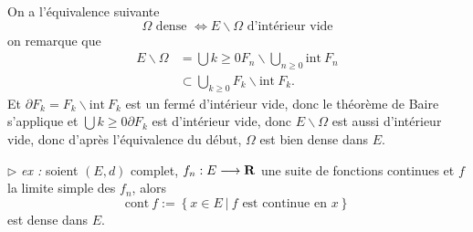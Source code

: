 \documentclass[a4paper,11pt, twoside]{article}
\begin{document}
\begin{Proof}
  On a l'équivalence suivante 
  $$\Omega\text{ dense }\Leftrightarrow E\backslash \Omega\text{ d'intérieur vide}$$
  on remarque que 
  \begin{align*}
    E\backslash\Omega&=\bigcup{k\geqslant 0}F_n\backslash\bigcup_{n\geqslant 0}\mathrm{int}\ F_n\\
    &\subset \bigcup_{k\geqslant 0}F_k\backslash\mathrm{int}\ F_k.
  \end{align*}
  Et $\partial F_k=F_k\backslash\mathrm{int}\ F_k$ est un fermé d'intérieur vide, donc le théorème de Baire s'applique et $\bigcup{k\geqslant 0}\partial F_k$ est d'intérieur vide, donc $E\backslash\Omega$ est aussi d'intérieur vide, donc d'après l'équivalence du début, $\Omega$ est bien dense dans $E$.
\end{Proof}

$\triangleright$\emph{ ex :} soient $(E,d)$ complet, $f_n:E\longrightarrow \mathbf R$ une suite de fonctions continues et $f$ la limite simple des $f_n$, alors 
$$\mathrm{cont}\ f:=\left\{x\in E\ |\ f\text{ est continue en }x\right\}$$
est dense dans $E$.
\end{document}
